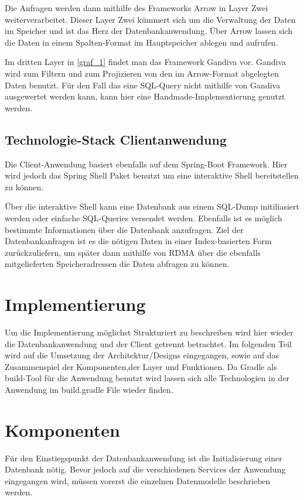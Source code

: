Die Anfragen werden dann mithilfe des Frameworks Arrow in Layer Zwei weiterverarbeitet. Dieser Layer Zwei kümmert sich um die Verwaltung der Daten im Speicher und ist das Herz der Datenbankanwendung. Über Arrow lassen sich die Daten in einem Spalten-Format im Hauptspeicher ablegen und aufrufen.

Im dritten Layer in \ref{graf_1} findet man das Framework Gandiva vor. 
Gandiva wird zum Filtern und zum Projizieren von den im Arrow-Format abgelegten Daten benutzt. Für den Fall das eine SQL-Query nicht mithilfe von Gandiva ausgewertet werden kann, kann hier eine Handmade-Implementierung genutzt werden.



\subsection{Technologie-Stack Clientanwendung}

Die Client-Anwendung basiert ebenfalls auf dem Spring-Boot Framework. Hier wird jedoch das Spring Shell Paket benutzt um eine interaktive Shell bereitstellen zu können.

Über die interaktive Shell kann eine Datenbank aus einem SQL-Dump initiliasiert werden oder einfache SQL-Queries versendet werden. Ebenfalls ist es möglich bestimmte Informationen über die Datenbank anzufragen.
Ziel der Datenbankanfragen ist es die nötigen Daten in einer Index-basierten Form zurückzuliefern, um später dann mithilfe von RDMA über die ebenfalls mitgelieferten Speicheradressen die Daten abfragen zu können.


\section{Implementierung}

Um die Implementierung möglichst Strukturiert zu beschreiben wird hier wieder die Datenbankanwendung und der Client getrennt betrachtet.
Im folgenden Teil wird auf die Umsetzung der Architektur/Designs eingegangen, sowie auf das Zusammenspiel der Komponenten,der Layer und Funktionen.
Da Gradle als build-Tool für die Anwendung benutzt wird lassen sich alle Technologien in der Anwendung im build.gradle File wieder finden. 


\section{Komponenten}

Für den Einstiegspunkt der Datenbankanwendung ist die Initialisierung einer Datenbank nötig. Bevor jedoch auf die verschiedenen Services der Anwendung eingegangen wird, müssen vorerst die einzelnen Datenmodelle beschrieben werden. 

